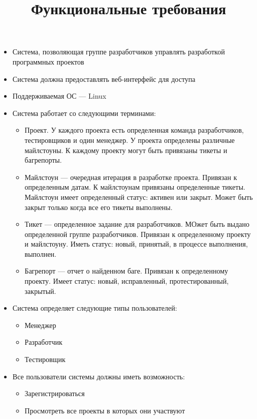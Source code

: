 \documentclass[12pt,a4paper]{article}
\begin{document}
\title{Функциональные требования}
\maketitle

\begin{itemize}
\item Система, позволяющая группе разработчиков управлять разработкой программных проектов

\item Система должна предоставлять веб-интерфейс для доступа

\item Поддерживаемая ОС --- Linux

\item Система работает со следующими терминами:
\begin{itemize}
\item Проект.  У каждого проекта есть определенная команда разработчиков, тестировщиков и один менеджер. У проекта определены различные майлстоуны. К каждому проекту могут быть привязаны тикеты и багрепорты.

\item Майлстоун --- очередная итерация в разработке проекта. Привязан к определенным датам. К майлстоунам привязаны определенные тикеты. Майлстоун имеет определенный статус: активен или закрыт. Может быть закрыт только когда все его тикеты выполнены.

\item Тикет --- определенное задание для разработчиков. МОжет быть выдано определенной группе разработчиков. Привязан к определенному проекту и майлстоуну. Иметь статус: новый, принятый, в процессе выполнения, выполнен.

\item Багрепорт --- отчет о найденном баге. Привязан к определенному проекту. Имеет статус: новый, исправленный, протестированный, закрытый.
\end{itemize}

\item Система определяет следующие типы пользователей:
\begin{itemize}
\item Менеджер
\item Разработчик
\item Тестировщик
\end{itemize}

\item Все пользователи системы должны иметь возможность:
\begin{itemize}
\item Зарегистрироваться
\item Просмотреть все проекты в которых они участвуют
\end{itemize}


\end{itemize}
\end{document}
